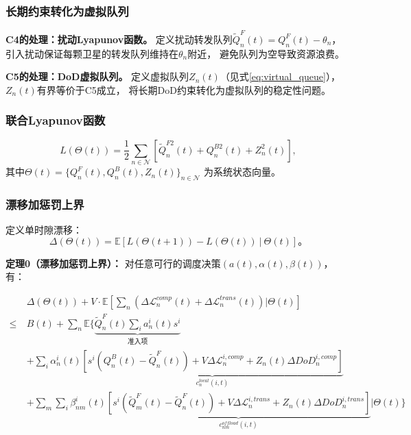 \documentclass[a4paper,11pt]{article}
\begin{document}
\subsubsection{长期约束转化为虚拟队列}

\textbf{C4的处理：扰动Lyapunov函数。}
定义扰动转发队列$\tilde{Q}^F_n(t) = Q^F_n(t) - \theta_n$，
引入扰动保证每颗卫星的转发队列维持在$\theta_n$附近，
避免队列为空导致资源浪费\cite{zhang2024mhspo}。

\textbf{C5的处理：DoD虚拟队列。}
定义虚拟队列$Z_n(t)$（见式\eqref{eq:virtual_queue}），
$Z_n(t)$有界等价于C5成立，
将长期DoD约束转化为虚拟队列的稳定性问题。

\subsubsection{联合Lyapunov函数}

\begin{equation}
L(\Theta(t)) = \frac{1}{2}\sum_{n \in \mathcal{N}}
\left[\tilde{Q}^{F2}_n(t) + Q^{B2}_n(t) + Z^2_n(t)\right],
\label{eq:lyapunov}
\end{equation}
其中$\Theta(t) = \{Q^F_n(t), Q^B_n(t), Z_n(t)\}_{n \in \mathcal{N}}$
为系统状态向量。

\subsubsection{漂移加惩罚上界}

定义单时隙漂移：
\begin{equation}
\Delta(\Theta(t)) = \mathbb{E}[L(\Theta(t+1))
- L(\Theta(t))\ |\ \Theta(t)]。
\label{eq:drift}
\end{equation}

\textbf{定理0（漂移加惩罚上界）：}
对任意可行的调度决策$(a(t), \alpha(t), \beta(t))$，有：

\begin{equation}
\begin{aligned}
&\Delta(\Theta(t)) + V\cdot\mathbb{E}\left[
\sum_n(\Delta\mathcal{L}^{comp}_n(t)
+ \Delta\mathcal{L}^{trans}_n(t))\bigg|\Theta(t)\right] \\
\leq\ &B(t) + \sum_n\mathbb{E}\Bigg\{
\underbrace{\tilde{Q}^F_n(t)\sum_i a^i_n(t)s^i}_{\text{准入项}} \\
&+\sum_i\alpha^i_n(t)
\underbrace{\left[s^i(Q^B_n(t) - \tilde{Q}^F_n(t))
+ V\Delta\mathcal{L}^{i,comp}_n
+ Z_n(t)\Delta DoD^{i,comp}_n\right]}_{c^{local}_n(i,t)} \\
&+\sum_m\sum_i\beta^i_{nm}(t)
\underbrace{\left[s^i(\tilde{Q}^F_m(t) - \tilde{Q}^F_n(t))
+ V\Delta\mathcal{L}^{i,trans}_n
+ Z_n(t)\Delta DoD^{i,trans}_n\right]}_{c^{offload}_{nm}(i,t)}
\Bigg|\Theta(t)\Bigg\}
\end{aligned}
\label{eq:drift_penalty}
\end{equation}
\end{document}
